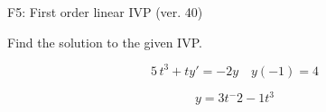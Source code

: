 \begin{exercise}
  \begin{exerciseTitle}F5: First order linear IVP (ver. 40)\end{exerciseTitle}
  \begin{exerciseStatement}
    
Find the solution to the given IVP.

    
\[5 \, t^{3} +ty'= -2 y \hspace{1em} y( -1 ) = 4\]

  \end{exerciseStatement}
  \begin{exerciseAnswer}
    
\[y= 3 t^ -2 -1 t^{3}\]

  \end{exerciseAnswer}
\end{exercise}